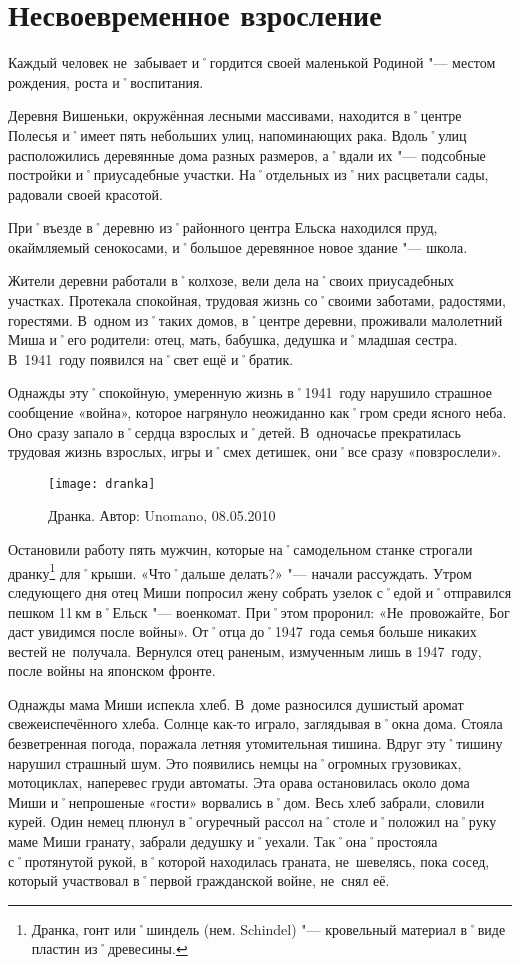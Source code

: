 ﻿\chapter{Несвоевременное взросление}
Каждый человек не~забывает и˚гордится своей маленькой Родиной "--- местом рождения, роста и˚воспитания.

Деревня Вишеньки, окружённая лесными массивами, находится в˚центре Полесья и˚имеет пять небольших улиц, напоминающих рака. Вдоль˚улиц расположились деревянные дома разных размеров, а˚вдали их "--- подсобные постройки и˚приусадебные участки. На˚отдельных из˚них расцветали сады, радовали своей красотой.

При˚въезде в˚деревню из˚районного центра Ельска находился пруд, окаймляемый сенокосами, и˚большое деревянное новое здание "--- школа.

Жители деревни работали в˚колхозе, вели дела на˚своих приусадебных участках. Протекала спокойная, трудовая жизнь со˚своими заботами, радостями, горестями. В~одном из˚таких домов, в˚центре деревни, проживали малолетний Миша и˚его родители: отец, мать, бабушка, дедушка и˚младшая сестра. В~1941~году появился на˚свет ещё и˚братик. 

Однажды эту˚спокойную, умеренную жизнь в˚1941~году нарушило страшное сообщение «война», которое нагрянуло неожиданно как˚гром среди ясного неба. Оно сразу запало в˚сердца взрослых и˚детей. В~одночасье прекратилась трудовая жизнь взрослых, игры и˚смех детишек, они˚все сразу «повзрослели». 

\begin{wrapfigure}{O}{.4\textwidth}
\centering
\texttt{[image: dranka]}
\caption{Дранка. Автор: Unomano, 08.05.2010}
\label{fig:dranka}
\end{wrapfigure}

Остановили работу пять мужчин, которые на˚самодельном станке строгали дранку\footnote{Дранка, гонт или˚шиндель (нем. Schindel) "--- кровельный материал в˚виде пластин из˚древесины.} для˚крыши. «Что˚дальше делать?» "--- начали рассуждать. Утром следующего дня отец Миши попросил жену собрать узелок с˚едой и˚отправился пешком 11\,км в˚Ельск "--- военкомат. При˚этом проронил: «Не~провожайте, Бог даст увидимся после войны». От˚отца до˚1947~года семья больше никаких вестей не~получала. Вернулся отец раненым, измученным лишь в 1947~году, после войны на японском фронте. 

Однажды мама Миши испекла хлеб. В~доме разносился душистый аромат свежеиспечённого хлеба. Солнце как-то играло, заглядывая в˚окна дома. Стояла безветренная погода, поражала летняя утомительная тишина. Вдруг эту˚тишину нарушил страшный шум. Это появились немцы на˚огромных грузовиках, мотоциклах, наперевес груди автоматы. Эта орава остановилась около дома Миши и˚непрошеные «гости» ворвались в˚дом. Весь хлеб забрали, словили курей. Один немец плюнул в˚огуречный рассол на˚столе и˚положил на˚руку маме Миши гранату, забрали дедушку и˚уехали. Так˚она˚простояла с˚протянутой рукой, в˚которой находилась граната, не~шевелясь, пока сосед, который участвовал в˚первой гражданской войне, не~снял её.

